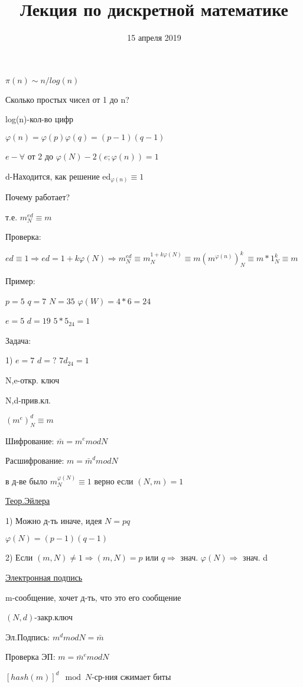 \documentclass{article}
\title{Лекция по дискретной математике}
\date{15 апреля 2019}
\begin{document}
 
\maketitle

$\pi(n)\sim n/log(n)$ 

Сколько простых чисел от 1 до n?

log(n)-кол-во цифр

$\varphi(n)=\varphi(p)\varphi(q)=(p-1)(q-1)$

$e-\forall$ от 2 до $\varphi(N)-2 (e;\varphi(n))=1$

d-Находится, как решение ed$_{\varphi(n)}\equiv1$

Почему работает?

т.е. $m^{ed}_N\equiv m$

Проверка:

$ed\equiv 1 \Longrightarrow ed=1+k\varphi(N) \Longrightarrow
m^{ed} _{N}\equiv m^{1+k\varphi(N)}_{N}\equiv m(m^{\varphi(n)})^k_{N} \equiv m*1^k_{N} \equiv m$

Пример:

$p=5$ $q=7$ $N=35$ $\varphi(W)=4*6=24$

$e=5$  $d=19$ $5*5_{24}=1$

Задача:

1) $e=7$  $d=?$ $7d_{24}=1$

N,e-откр. ключ 

N,d-прив.кл.

$(m^e)^d_{N}\equiv m$

Шифрование: $\bar{m}=m^e mod N$

Расшифрование: $m=\bar{m}^d mod N$

в д-ве было $m^{\varphi(N)}_{N}\equiv1$ верно если $(N,m)=1$

\underline{Теор.Эйлера}

1) Можно д-ть иначе, идея $N=pq$

$\varphi(N)=(p-1)(q-1)$

2) Если $(m,N)\ne1 \Longrightarrow (m,N)=p$ или $q \Longrightarrow$ знач.
$\varphi(N)  \Longrightarrow$ знач. d


\underline{Электронная подпись}

m-сообщение, хочет д-ть, что это его сообщение

$(N,d)$-закр.ключ

Эл.Подпись: $m^d mod N=\bar{m}$ 

Проверка ЭП: $m=\bar{m}^e mod N$

$[hash(m)]^d \mod N$-ср-ния сжимает биты
\end{document}
